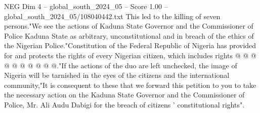 \begin{textsample}{NEG Dim 4 – global\_south\_2024\_05 – Score 1.00 – global\_south\_2024\_05/108040442.txt}
This led to the killing of seven persons."We see the actions of Kaduna State Governor and the Commissioner of Police Kaduna State as arbitrary, unconstitutional and in breach of the ethics of the Nigerian Police."Constitution of the Federal Republic of Nigeria has provided for and protects the rights of every Nigerian citizen, which includes rights @ @ @ @ @ @ @ @ @ @."If the actions of the duo are left unchecked, the image of Nigeria will be tarnished in the eyes of the citizens and the international community,"It is consequent to these that we forward this petition to you to take the necessary action on the Kaduna State Governor and the Commissioner of Police, Mr.
Ali Audu Dabigi for the breach of citizens ' constitutional rights".

\end{textsample}
